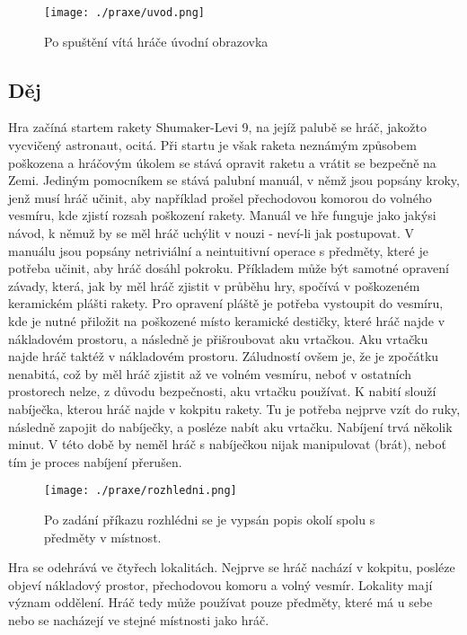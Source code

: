 \documentclass[main.tex]{subfiles}
\begin{document}
		\begin{figure}[h]
			\centering
			\texttt{[image: ./praxe/uvod.png]}
			\caption{Po spuštění vítá hráče úvodní obrazovka}
		\end{figure}
\subsection{Děj}
Hra začíná startem rakety Shumaker-Levi 9, na jejíž palubě se hráč, jakožto vycvičený astronaut, ocitá. Při startu je však raketa neznámým způsobem poškozena a hráčovým úkolem se stává opravit raketu a vrátit se bezpečně na Zemi. Jediným pomocníkem se stává palubní manuál, v němž jsou popsány kroky, jenž musí hráč učinit, aby například prošel přechodovou komorou do volného vesmíru, kde zjistí rozsah poškození rakety. Manuál ve hře funguje jako jakýsi návod, k němuž by se měl hráč uchýlit v nouzi - neví-li jak postupovat. V manuálu jsou popsány netriviální a neintuitivní operace s předměty, které je potřeba učinit, aby hráč dosáhl pokroku. Příkladem může být samotné opravení závady, která, jak by měl hráč zjistit v průběhu hry, spočívá v poškozeném keramickém plášti rakety. Pro opravení pláště je potřeba vystoupit do vesmíru, kde je nutné přiložit na poškozené místo keramické destičky, které hráč najde v nákladovém prostoru, a následně je přišroubovat aku vrtačkou. Aku vrtačku najde hráč taktéž v nákladovém prostoru. Záludností ovšem je, že je zpočátku nenabitá, což by měl hráč zjistit až ve volném vesmíru, neboť v ostatních prostorech nelze, z důvodu bezpečnosti, aku vrtačku používat. K nabití slouží nabíječka, kterou hráč najde v kokpitu rakety. Tu je potřeba nejprve vzít do ruky, následně zapojit do nabíječky, a posléze nabít aku vrtačku. Nabíjení trvá několik minut. V této době by neměl hráč s nabíječkou nijak manipulovat (brát), neboť tím je proces nabíjení přerušen.  
		\begin{figure}[h]
			\centering
			\texttt{[image: ./praxe/rozhledni.png]}
			\caption{Po zadání příkazu rozhlédni se je vypsán popis okolí spolu s předměty v místnost.}
		\end{figure}


Hra se odehrává ve čtyřech lokalitách. Nejprve se hráč nachází v kokpitu, posléze objeví nákladový prostor, přechodovou komoru a volný vesmír. Lokality mají význam oddělení. Hráč tedy může používat pouze předměty, které má u sebe nebo se nacházejí ve stejné místnosti jako hráč. 
\end{document}
